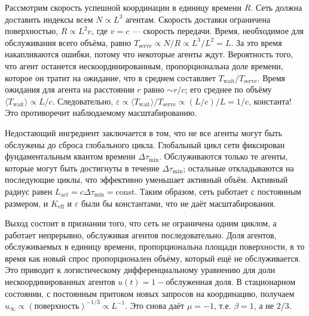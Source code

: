 \documentclass[11pt,a4paper]{article}
\begin{document}
	Рассмотрим скорость успешной координации в единицу времени \(R\). Сеть должна доставить индексы всем \(N \propto L^3\) агентам. Скорость доставки ограничена поверхностью, \(R \propto L^2 v\), где \(v = c\) — скорость передачи. Время, необходимое для обслуживания всего объёма, равно \(T_{\mathrm{serve}} \propto N/R \propto L^3/L^2 = L\). За это время накапливаются ошибки, потому что некоторые агенты ждут. Вероятность того, что агент останется нескоординированным, пропорциональна доле времени, которое он тратит на ожидание, что в среднем составляет \(T_{\mathrm{wait}}/T_{\mathrm{serve}}\). Время ожидания для агента на расстоянии \(r\) равно \(\sim r/c\); его среднее по объёму \(\langle T_{\mathrm{wait}} \rangle \propto L/c\). Следовательно, \(\varepsilon \propto \langle T_{\mathrm{wait}} \rangle/T_{\mathrm{serve}} \propto (L/c)/L = 1/c\), константа! Это противоречит наблюдаемому масштабированию.
	
	Недостающий ингредиент заключается в том, что не все агенты могут быть обслужены до сброса глобального цикла. Глобальный цикл сети фиксирован фундаментальным квантом времени \(\Delta\tau_{\min}\). Обслуживаются только те агенты, которые могут быть достигнуты в течение \(\Delta\tau_{\min}\); остальные откладываются на последующие циклы, что эффективно уменьшает активный объём. Активный радиус равен \(L_{\mathrm{act}} = c\Delta\tau_{\min} = \text{const}\). Таким образом, сеть работает с постоянным размером, и \(K_{\mathrm{eff}}\) и \(\varepsilon\) были бы константами, что не даёт масштабирования.
	
	Выход состоит в признании того, что сеть не ограничена одним циклом, а работает непрерывно, обслуживая агентов последовательно. Доля агентов, обслуживаемых в единицу времени, пропорциональна площади поверхности, в то время как новый спрос пропорционален объёму, который ещё не обслуживается. Это приводит к логистическому дифференциальному уравнению для доли нескоординированных агентов \(u(t) = 1 - \text{обслуженная доля}\). В стационарном состоянии, с постоянным притоком новых запросов на координацию, получаем \(u_{\infty} \propto (\text{поверхность})^{-1/3} \propto L^{-1}\). Это снова даёт \(\mu = -1\), т.е. \(\beta = 1\), а не \(2/3\).
	
\end{document}
